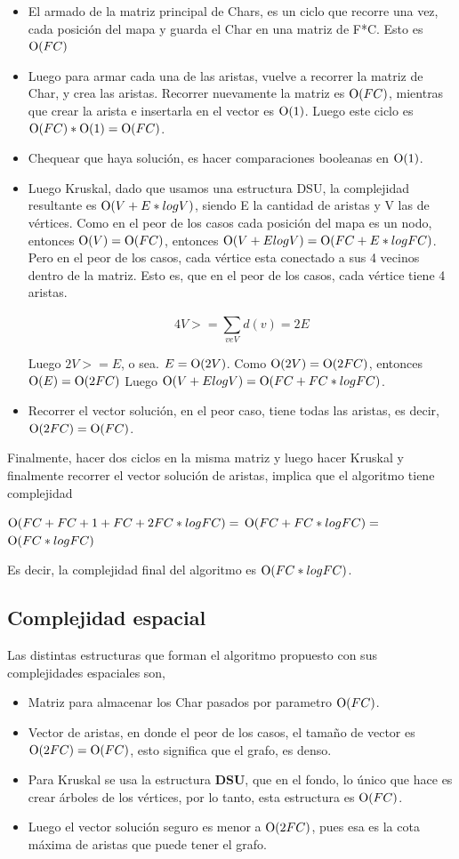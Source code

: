 	\begin{itemize}
	 \item El armado de la matriz principal de Chars, es un ciclo que recorre una vez, cada posición del mapa y guarda el Char en una matriz de F*C. Esto es $\operatorname{O}(FC)$
	 \item Luego para armar cada una de las aristas, vuelve a recorrer la matriz de Char, y crea las aristas. Recorrer nuevamente la matriz es $\operatorname{O}(FC)$, mientras que crear la arista e insertarla en el vector es $\operatorname{O}(1)$. Luego este ciclo es $\operatorname{O}(FC) * \operatorname{O}(1) = \operatorname{O}(FC)$.
	 \item Chequear que haya solución, es hacer comparaciones booleanas en $\operatorname{O}(1)$.
	 \item Luego Kruskal, dado que usamos una estructura DSU, la complejidad resultante es $\operatorname{O}(V + E*log V )$, siendo E la cantidad de aristas y V las de vértices. Como en el peor de los casos cada posición del mapa es un nodo, entonces $\operatorname{O}(V) = \operatorname{O}(FC)$, entonces $\operatorname{O}(V + E log V ) = \operatorname{O}(FC + E*log FC)$. Pero en el peor de los casos, cada vértice esta conectado a sus 4 vecinos dentro de la matriz. Esto es, que en el peor de los casos, cada vértice tiene 4 aristas.

	 	\[
		4V >= \sum_{veV}^{}d(v) = 2E
		\]

	  Luego $2V >= E$, o sea. $E = \operatorname{O}(2V)$. Como $\operatorname{O}(2V) = \operatorname{O}(2FC)$, entonces
	  $\operatorname{O}(E) = \operatorname{O}(2FC)$
	  Luego $\operatorname{O}(V + E log V ) = \operatorname{O}(FC + FC*log FC)$.
	 \item Recorrer el vector solución, en el peor caso, tiene todas las aristas, es decir, $\operatorname{O}(2FC) = \operatorname{O}(FC)$.

	\end{itemize}

	Finalmente, hacer dos ciclos en la misma matriz y luego hacer Kruskal y finalmente recorrer el vector solución de aristas, implica que el algoritmo tiene complejidad\par

	$\operatorname{O}(FC + FC + 1 + FC + 2FC*log FC) =$
	$\operatorname{O}(FC + FC*log FC) =$
	$\operatorname{O}(FC*log FC)$

	Es decir, la complejidad final del algoritmo es $\operatorname{O}(FC*log FC)$.

	\subsection{Complejidad espacial}
	Las distintas estructuras que forman el algoritmo propuesto con sus complejidades espaciales son,
	\begin{itemize}
		\item Matriz para almacenar los Char pasados por parametro $\operatorname{O}(FC)$.
		\item Vector de aristas, en donde el peor de los casos, el tamaño de vector es $\operatorname{O}(2FC) = \operatorname{O}(FC)$, esto significa que el grafo, es denso.
		\item Para Kruskal se usa la estructura \textbf{DSU}, que en el fondo, lo único que hace es crear árboles de los vértices, por lo tanto, esta estructura es $\operatorname{O}(FC)$.
		\item Luego el vector solución seguro es menor a $\operatorname{O}(2FC)$, pues esa es la cota máxima de aristas que puede tener el grafo.
	\end{itemize}

